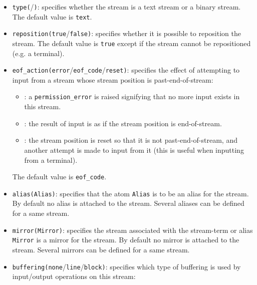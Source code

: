 \begin{itemize}

\item {}\texttt{type(}/\texttt{)}: specifies whether the
stream is a text stream or a binary stream. The default value is
\texttt{text}.

\item {}\texttt{reposition(true}/\texttt{false)}: specifies
whether it is possible to reposition the stream. The default value is
\texttt{true} except if the stream cannot be repositioned (e.g. a terminal).

\item {}\texttt{eof\_action(error}/\texttt{eof\_code}/\texttt{reset)}:
specifies the effect of attempting to input from a stream whose stream
position is past-end-of-stream:

\begin{itemize}

\item {}: a \texttt{permission\_error} is raised signifying that
no more input exists in this stream.

\item {}: the result of input is as if the stream position
is end-of-stream.

\item {}: the stream position is reset so that it is not
past-end-of-stream, and another attempt is made to input from it (this is
useful when inputting from a terminal).

\end{itemize}

The default value is \texttt{eof\_code}.

\item {}\texttt{alias(Alias)}: specifies that the atom \texttt{Alias}
is to be an alias for the stream. By default no alias is attached to the
stream. Several aliases can be defined for a same stream.

\item {}\texttt{mirror(Mirror)}: specifies the stream associated with
the stream-term or alias \texttt{Mirror} is a mirror for the stream. By
default no mirror is attached to the stream. Several mirrors can be defined
for a same stream.

\item {}\texttt{buffering(none}/\texttt{line}/\texttt{block)}:
specifies which type of buffering is used by input/output operations on
this stream:


\end{itemize}
